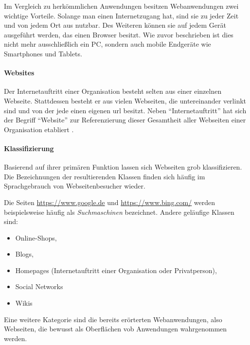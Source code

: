             Im Vergleich zu herkömmlichen Anwendungen besitzen Webanwendungen zwei wichtige Vorteile.
            Solange man einen Internetzugang hat, sind sie zu jeder Zeit und von jedem Ort aus nutzbar.
            Des Weiteren können sie auf jedem Gerät ausgeführt werden,
            das einen Browser besitzt. Wie zuvor beschrieben ist dies nicht mehr ausschließlich ein PC,
            sondern auch mobile Endgeräte wie Smartphones und Tablets.

            \paragraph*{Websites}
            Der Internetauftritt einer Organisation besteht selten aus einer
            einzelnen Webseite.
            Stattdessen besteht er aus vielen Webseiten,
            die untereinander verlinkt sind und von der jede einen eigenen
            \gls{url} besitzt.
            Neben "`Internetauftritt"' hat sich der Begriff "`Website"' zur
            Referenzierung dieser Gesamtheit aller Webseiten einer Organisation
            etabliert \cite{duden:Internetauftritt, oxford:Website}.

            \paragraph*{Klassifizierung}
            Basierend auf ihrer primären Funktion lassen sich Webseiten grob klassifizieren.
            Die Bezeichnungen der resultierenden Klassen finden sich häufig im Sprachgebrauch
            von Webseitenbesucher wieder.

            Die Seiten \url{https://www.google.de} und \url{https://www.bing.com/}
            werden beispielsweise häufig als \textit{Suchmaschinen} bezeichnet.
            Andere geläufige Klassen sind:

            \begin{itemize}
                \item Online-Shops,
                \item Blogs,
                \item Homepages (Internetauftritt einer Organisation oder Privatperson),
                \item Social Networks
                \item Wikis
            \end{itemize}

            Eine weitere Kategorie sind die bereits erörterten Webanwendungen,
            also Webseiten, die bewusst als Oberflächen vob Anwendungen wahrgenommen werden.

